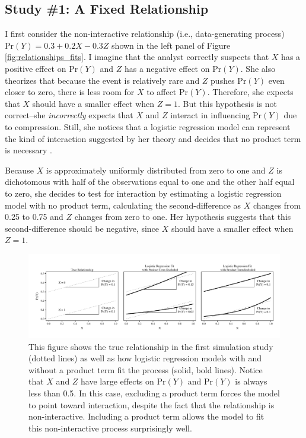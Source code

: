 \documentclass[12pt]{article}
\begin{document}
\subsection*{Study \#1: A Fixed Relationship} 

I first consider the non-interactive relationship (i.e., data-generating process) $\text{Pr}(Y) = 0.3 + 0.2X - 0.3Z$ shown in the left panel of Figure \ref{fig:relationships_fits}. I imagine that the analyst correctly suspects that $X$ has a positive effect on $\text{Pr}(Y)$ and $Z$ has a negative effect on $\text{Pr}(Y)$.  She also theorizes that because the event is relatively rare and $Z$ pushes $\text{Pr}(Y)$ even closer to zero,  there is less room for $X$ to affect $\text{Pr}(Y)$. Therefore, she expects that $X$ should have a smaller effect when $Z=1$. But this hypothesis is not correct--she \textit{incorrectly} expects that $X$ and $Z$ interact in influencing $\text{Pr}(Y)$ due to compression. Still, she notices that a logistic regression model can represent the kind of interaction suggested by her theory and decides that no product term is necessary \citep{BerryDeMerittEsarey2010}. 

Because $X$ is approximately uniformly distributed from zero to one and $Z$ is dichotomous with half of the observations equal to one and the other half equal to zero, she decides to test for interaction by estimating a logistic regression model with no product term, calculating the second-difference as $X$ changes from 0.25 to 0.75 and $Z$ changes from zero to one. Her hypothesis suggests that this second-difference should be negative, since $X$ should have a smaller effect when $Z=1$.

\begin{figure}[H]
\begin{center}
\includegraphics[width=\linewidth]{fig/fig-example.pdf}
\end{center}
\caption{This figure shows the true relationship in the first simulation study (dotted lines) as well as how logistic regression models with and without a product term fit the process (solid, bold lines). Notice that $X$ and $Z$ have large effects on $\text{Pr}(Y)$ and $\text{Pr}(Y)$ is always less than 0.5. In this case, excluding a product term forces the model to point toward interaction, despite the fact that the relationship is non-interactive. Including a product term allows the model to fit this non-interactive process surprisingly well.}\label{fig:relationships-fits}
\end{figure}
\end{document}
